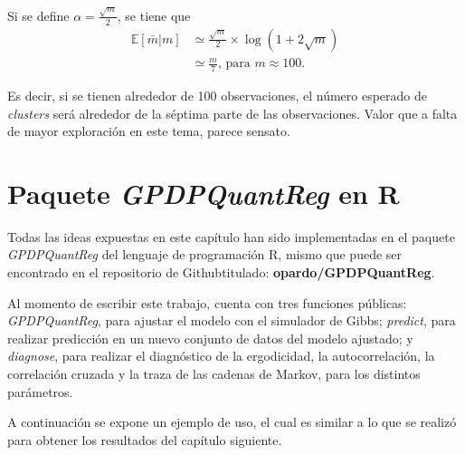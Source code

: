Si se define $\alpha = \frac{\sqrt{m}}{2}$, se tiene que
\begin{equation*}
\begin{aligned}
    \mathbb{E}[\bar{m}|m] 
    &\simeq 
    \frac{\sqrt{m}}{2}
    \times
    \log 
    \left(
        1 + 2\sqrt{m}
    \right)\\
    &\simeq
    \frac{m}{7} 
    \text{, para } m \approx 100.
\end{aligned}
\end{equation*}

Es decir, si se tienen alrededor de 100 observaciones, el n\'umero esperado de \textit{clusters} ser\'a alrededor de la s\'eptima parte de las observaciones. Valor que a falta de mayor exploraci\'on en este tema, parece sensato.

\section{Paquete \textit{GPDPQuantReg} en R}

Todas las ideas expuestas en este cap\'itulo han sido implementadas en el paquete \textit{GPDPQuantReg} del lenguaje de programaci\'on R, mismo que puede ser encontrado en el repositorio de Github\faGithub \space titulado: \textbf{opardo/GPDPQuantReg}.

Al momento de escribir este trabajo, cuenta con tres funciones p\'ublicas: \textit{GPDPQuantReg}, para ajustar el modelo con el simulador de Gibbs; \textit{predict}, para realizar predicci\'on en un nuevo conjunto de datos del modelo ajustado; y \textit{diagnose}, para realizar el diagn\'ostico de la ergodicidad, la autocorrelaci\'on, la correlaci\'on cruzada y la traza de las cadenas de Markov, para los distintos par\'ametros.

A continuaci\'on se expone un ejemplo de uso, el cual es similar a lo que se realiz\'o para obtener los resultados del cap\'itulo siguiente.



\newpage